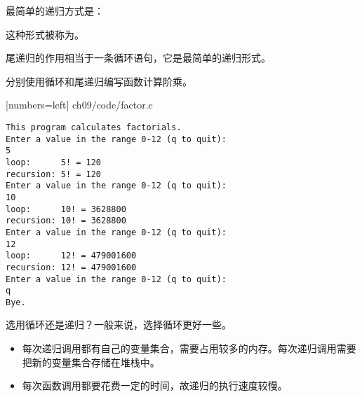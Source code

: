 \begin{frame}[fragile]
最简单的递归方式是：\vspace{.1in}

\vspace{.1in} 

这种形式被称为。\vspace{.1in}

尾递归的作用相当于一条循环语句，它是最简单的递归形式。
\end{frame}

\begin{frame}[fragile]
\begin{biancheng}
  分别使用循环和尾递归编写函数计算阶乘。
\end{biancheng}
\end{frame}

\begin{frame}
  
  [numbers=left]
  {ch09/code/factor.c}
\end{frame}


\begin{frame}
\begin{lstlisting}
This program calculates factorials.
Enter a value in the range 0-12 (q to quit):
5
loop:      5! = 120
recursion: 5! = 120
Enter a value in the range 0-12 (q to quit):
10
loop:      10! = 3628800
recursion: 10! = 3628800
Enter a value in the range 0-12 (q to quit):
12
loop:      12! = 479001600
recursion: 12! = 479001600
Enter a value in the range 0-12 (q to quit):
q
Bye.
\end{lstlisting}
\end{frame}

\begin{frame}[fragile]
{\Large 选用循环还是递归？}\pause 一般来说，选择循环更好一些。
\pause
\vspace{0.1in}

\begin{itemize}
\item 每次递归调用都有自己的变量集合，需要占用较多的内存。每次递归调用需要把新的变量集合存储在堆栈中。\\[0.1in]
\item 每次函数调用都要花费一定的时间，故递归的执行速度较慢。
\end{itemize}
\end{frame}

